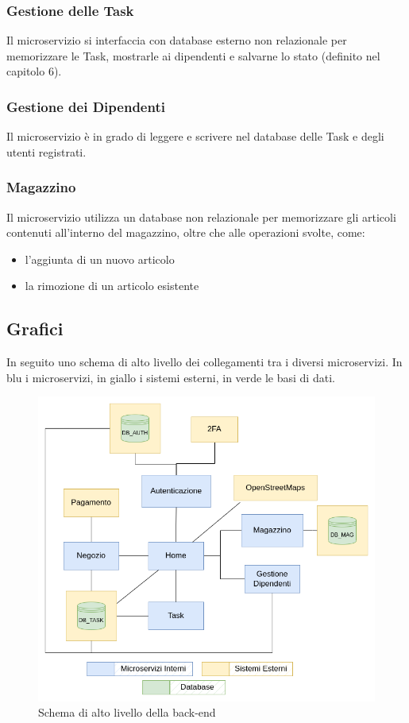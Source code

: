 \documentclass{report}
\begin{document}
\subsubsection*{Gestione delle Task}
Il microservizio si interfaccia con database esterno non relazionale per memorizzare le Task, mostrarle ai dipendenti e salvarne lo stato (definito nel capitolo 6).

\subsubsection*{Gestione dei Dipendenti}
Il microservizio è in grado di leggere e scrivere nel database delle Task e degli utenti registrati.

\subsubsection*{Magazzino}
Il microservizio utilizza un database non relazionale per memorizzare gli articoli contenuti all’interno del magazzino, oltre che alle operazioni svolte, come:

\begin{itemize}
	\item l’aggiunta di un nuovo articolo
	
	\item la rimozione di un articolo esistente
\end{itemize}

\subsection{Grafici}

In seguito uno schema di alto livello dei collegamenti tra i diversi microservizi. In blu i microservizi, in giallo i sistemi esterni, in verde le basi di dati.

\begin{figure}[H]
	\includegraphics[width=1\textwidth]{images/back_end_short}
	\caption{Schema di alto livello della back-end}
\end{figure}	
\end{document}
